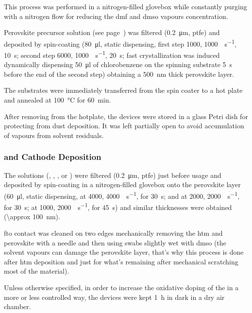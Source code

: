 			This process was performed in a nitrogen-filled glovebox
			while constantly purging with a nitrogen flow for reducing the \gls{dmf} and \gls{dmso} vapours concentration.
			
			Perovskite precursor solution (see page~\pageref{precursors_csfamapbibr}) was filtered (\SI{0.2}{\um}, \gls{ptfe})
			and deposited by spin-coating (\SI{80}{\ul}, static dispensing, first step \SI{1000}{\rpm}, \SI{1000}{\rpm\per\s}, \SI{10}{\s};
			second step \SI{6000}{\rpm}, \SI{1000}{\rpm\per\s}, \SI{20}{\s}; fast crystallization was induced dynamically
			dispensing \SI{50}{\ul} of chlorobenzene on the spinning substrate \SI{5}{\s} before the end of the second
			step) obtaining a \SI{500}{\nm} thick perovskite layer.
			
			The substrates were immediately transferred from
			the spin coater to a hot plate and annealed at \SI{100}{\celsius} for \SI{60}{\minute}. 
	
			After removing from the hotplate, the devices were stored in a glass Petri dish for protecting from dust deposition. It was left partially open to avoid accumulation of vapours from solvent residuals.
			 
		\subsubsection{ and Cathode Deposition}
		
			The  solutions (\spiro, , , or ) were filtered (\SI{0.2}{\um}, \gls{ptfe}) just before usage and deposited by spin-coating in a nitrogen-filled glovebox
			onto the perovskite layer (\SI{60}{\ul}, static dispensing, \spiro at \SI{4000}{\rpm}, \SI{4000}{\rpm\per\s},
			for \SI{30}{\s};  and  at \SI{2000}{\rpm}, \SI{2000}{\rpm\per\s}, for \SI{30}{\s};  at \SI{1000}{\rpm}, \SI{2000}{\rpm\per\s},
			for \SI{45}{\s}) and similar  thicknesses were obtained (\SI{\approx 100}{\nm}).
			
			\Gls{fto} contact was cleaned on two edges mechanically removing the \gls{htm} and perovskite with a needle and then using swabs slightly wet with \gls{dmso} (the solvent vapours can damage the perovskite layer, that's why this process is done after \gls{htm} deposition and just for what's remaining after mechanical scratching most of the material).
			
			Unless otherwise specified, in order to increase the
			oxidative doping of the  in a more or less controlled way, the devices were kept \SI{1}{\hour} in dark in a dry air chamber.
			
